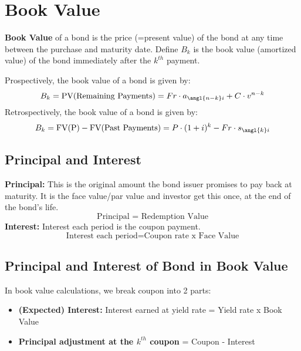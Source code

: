\section{Book Value}
\begin{definition}
    \textbf{Book Value} of a bond is the price (=present value) of the bond at any time between the purchase and maturity date.
    Define $B_k$ is the book value (amortized value) of the bond immediately after the $k^{th}$ payment. 
\end{definition}

\begin{comments}
    Prospectively, the book value of a bond is given by: 
    \[
    B_k = \text{PV(Remaining Payments)} = Fr \cdot a_{\angl{n-k}i} + C \cdot v^{n-k}
    \]
    Retrospectively, the book value of a bond is given by: 
    \[
        B_k = \text{FV(P)} - \text{FV(Past Payments)} = P \cdot (1+i)^k - Fr \cdot s_{\angl{k}i}
    \]
\end{comments}




\subsection{Principal and Interest}
\begin{comments}
\textbf{Principal: }This is the original amount the bond issuer promises to pay back at maturity.
            It is the face value/par value and investor get this once, at the end of the bond's life.  \\
            \[
                \text{Principal = Redemption Value}
            \]
\textbf{Interest: } Interest each period is the coupon payment. 
\[
\text{Interest each period} = \text{Coupon rate x Face Value}
\]
\end{comments}





\subsection{Principal and Interest of Bond in Book Value}
\begin{comments}
    In book value calculations, we break coupon into 2 parts: 
    \begin{itemize}
        \item \textbf{(Expected) Interest: }Interest earned at yield rate = Yield rate x Book Value
        \item \textbf{Principal adjustment at the $k^{th}$ coupon }= Coupon - Interest 
    \end{itemize}
\end{comments}

